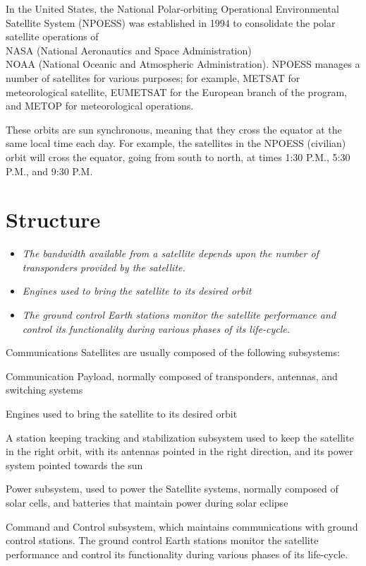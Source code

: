 In the United States, the National Polar-orbiting Operational
Environmental Satellite System (NPOESS) was established in 1994 to
consolidate the polar satellite operations of\\
NASA (National Aeronautics and Space Administration)\\
NOAA (National Oceanic and Atmospheric Administration). NPOESS manages a
number of satellites for various purposes; for example, METSAT for
meteorological satellite, EUMETSAT for the European branch of the
program, and METOP for meteorological operations.

These orbits are sun synchronous, meaning that they cross the equator at
the same local time each day. For example, the satellites in the NPOESS
(civilian) orbit will cross the equator, going from south to north, at
times 1:30 P.M., 5:30 P.M., and 9:30 P.M.

\section{Structure}\label{structure}

\begin{itemize}
\item
  \emph{The bandwidth available from a satellite depends upon the number
  of transponders provided by the satellite.}
\item
  \emph{Engines used to bring the satellite to its desired orbit}
\item
  \emph{The ground control Earth stations monitor the satellite
  performance and control its functionality during various phases of its
  life-cycle.}
\end{itemize}

Communications Satellites are usually composed of the following
subsystems:

Communication Payload, normally composed of transponders, antennas, and
switching systems

Engines used to bring the satellite to its desired orbit

A station keeping tracking and stabilization subsystem used to keep the
satellite in the right orbit, with its antennas pointed in the right
direction, and its power system pointed towards the sun

Power subsystem, used to power the Satellite systems, normally composed
of solar cells, and batteries that maintain power during solar eclipse

Command and Control subsystem, which maintains communications with
ground control stations. The ground control Earth stations monitor the
satellite performance and control its functionality during various
phases of its life-cycle.


